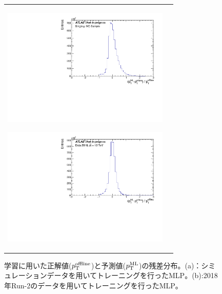\begin{figure}
    \begin{tabular}{cc}
    \centering
    \begin{minipage}[b]{0.45\hsize}%
        \centering
        \hspace*{-1.5cm}
        \includegraphics[clip, width=8cm]{fig/4/MC_predtrue.pdf}
        \subcaption{}
        \label{fig:predtrue_MC}
    \end{minipage}%
    \begin{minipage}[b]{0.7\hsize}%
        \centering
        \hspace*{-0.75cm}
        \includegraphics[clip, width=8cm]{fig/4/predtrue_perpt_v1.pdf}
        \subcaption{}
        \label{fig:predtrue_Data}
    \end{minipage}%
    \end{tabular}
    \caption{学習に用いた正解値($p_{\rm{T}}^{\rm{offline}}$)と予測値($p_{\rm{T}}^{\rm{ML}}$)の残差分布。(a)：シミュレーションデータを用いてトレーニングを行ったMLP。(b):2018年Run-2のデータを用いてトレーニングを行ったMLP。}
    \label{fig:predtrue}
\end{figure}

